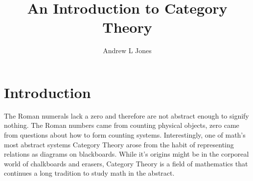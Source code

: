 \documentclass{article}
\title{An Introduction to Category Theory}
\author{Andrew L Jones}\date{}
\begin{document}
\maketitle



\section*{Introduction}
The Roman numerals lack a zero and therefore are not abstract enough to signify nothing. The Roman numbers came from counting physical objects, zero came from questions about how to form counting systems. Interestingly, one of math's most abstract systems Category Theory arose from the habit of representing relations as diagrams on blackboards. While it's origins might be in the corporeal world of chalkboards and erasers, Category Theory is a field of mathematics that continues a long tradition to study math in the abstract.

\end{document}
